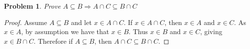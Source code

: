 \documentclass[12pt]{article}
\newcommand{\cont}{\subseteq}
\newtheorem{problem}{Problem}
\theoremstyle{remark}  %
\begin{document}
\begin{problem} Prove $A \subseteq B \Rightarrow A \cap C \cont B \cap C$
\end{problem}
\begin{proof} Assume $A \cont B $ and let $x\in A \cap C$. If $x \in  A \cap C$, then $x\in A$ and $x \in C$. As $x\in A$, by assumption we have that $x \in B$. Thus $x \in B$ and $x \in C$, giving $x\in B \cap C$. Therefore if $A \subseteq B $, then $A \cap C \cont B \cap C$.
\end{proof}

 
\fi
\end{document}
